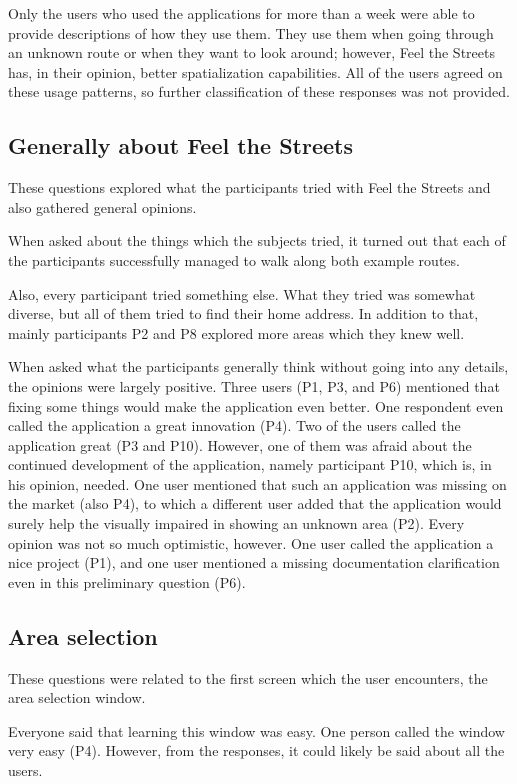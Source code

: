\documentclass[nolof,digital]{fithesis3}
\begin{document}
Only the users who used the applications for more than a week were able to provide descriptions of how they use them. They use them when going through an unknown route or when they want to look around; however, Feel the Streets has, in their opinion, better spatialization capabilities. All of the users agreed on these usage patterns, so further classification of these responses was not provided.
\subsection{Generally about Feel the Streets}
These questions explored what the participants tried with Feel the Streets and also gathered general opinions.

When asked about the things which the subjects tried, it turned out that each of the participants successfully managed to walk along both example routes.

Also, every participant tried something else. What they tried was somewhat diverse, but all of them tried to find their home address. In addition to that, mainly participants P2 and P8 explored more areas which they knew well.

When asked what the participants generally think without going into any details, the opinions were largely positive. Three users (P1, P3, and P6) mentioned that fixing some things would make the application even better. One respondent even called the application a great innovation (P4). Two of the users called the application great (P3 and P10). However, one of them was afraid about the continued development of the application, namely participant P10,  which is, in his opinion, needed. One user mentioned that such an application was missing on the market (also P4), to which a different user added that the application would surely help the visually impaired in showing an unknown area (P2). Every opinion was not so much optimistic, however. One user called the application a nice project (P1), and one user mentioned a missing documentation clarification even in this preliminary question (P6).
\subsection{Area selection}
These questions were related to the first screen which the user encounters, the area selection window.

Everyone said that learning this window was easy. One person called the window very easy (P4). However, from the responses, it could likely be said about all the users.
\end{document}
